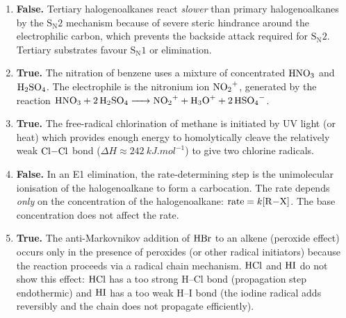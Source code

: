 \documentclass[11pt]{article}
\begin{document}
\begin{corrige}
\begin{enumerate}
\item \textbf{False.} Tertiary halogenoalkanes react \emph{slower} than primary halogenoalkanes by the \(\mathrm{S_N2}\) mechanism because of severe steric hindrance around the electrophilic carbon, which prevents the backside attack required for \(\mathrm{S_N2}\). Tertiary substrates favour \(\mathrm{S_N1}\) or elimination.

\item \textbf{True.} The nitration of benzene uses a mixture of concentrated \(\ce{HNO3}\) and \(\ce{H2SO4}\). The electrophile is the nitronium ion \(\ce{NO2+}\), generated by the reaction \(\ce{HNO3 + 2H2SO4 -> NO2+ + H3O+ + 2HSO4-}\).

\item \textbf{True.} The free-radical chlorination of methane is initiated by UV light (or heat) which provides enough energy to homolytically cleave the relatively weak \(\ce{Cl-Cl}\) bond (\(\Delta H \approx \SI{242}{kJ.mol^{-1}}\)) to give two chlorine radicals.

\item \textbf{False.} In an E1 elimination, the rate-determining step is the unimolecular ionisation of the halogenoalkane to form a carbocation. The rate depends \emph{only} on the concentration of the halogenoalkane: \(\text{rate} = k[\ce{R-X}]\). The base concentration does not affect the rate.

\item \textbf{True.} The anti-Markovnikov addition of \(\ce{HBr}\) to an alkene (peroxide effect) occurs only in the presence of peroxides (or other radical initiators) because the reaction proceeds via a radical chain mechanism. \(\ce{HCl}\) and \(\ce{HI}\) do not show this effect: \(\ce{HCl}\) has a too strong H–Cl bond (propagation step endothermic) and \(\ce{HI}\) has a too weak H–I bond (the iodine radical adds reversibly and the chain does not propagate efficiently).
\end{enumerate}
\end{corrige}
\end{document}
